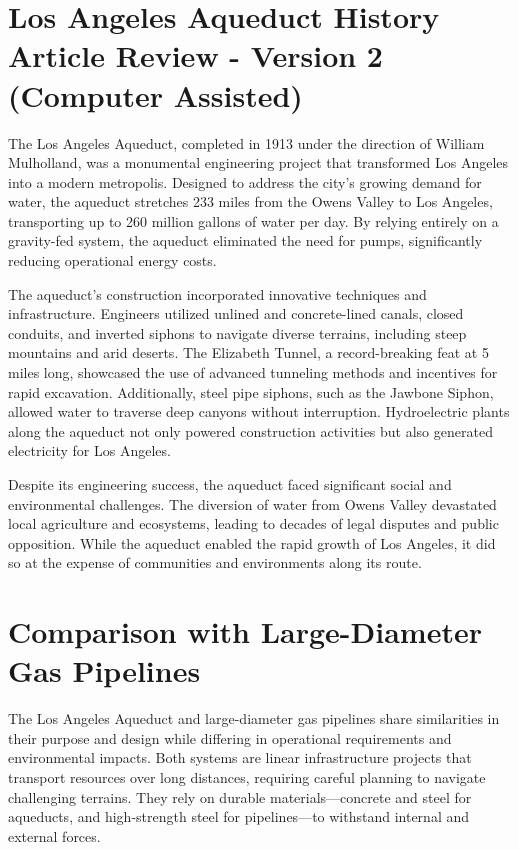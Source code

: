 \documentclass[12pt]{article}
\begin{document}
\section*{\small{Los Angeles Aqueduct History Article Review - Version 2 (Computer Assisted)}}

The Los Angeles Aqueduct, completed in 1913 under the direction of William Mulholland, was a monumental engineering project that transformed Los Angeles into a modern metropolis. Designed to address the city's growing demand for water, the aqueduct stretches 233 miles from the Owens Valley to Los Angeles, transporting up to 260 million gallons of water per day. By relying entirely on a gravity-fed system, the aqueduct eliminated the need for pumps, significantly reducing operational energy costs.

The aqueduct's construction incorporated innovative techniques and infrastructure. Engineers utilized unlined and concrete-lined canals, closed conduits, and inverted siphons to navigate diverse terrains, including steep mountains and arid deserts. The Elizabeth Tunnel, a record-breaking feat at 5 miles long, showcased the use of advanced tunneling methods and incentives for rapid excavation. Additionally, steel pipe siphons, such as the Jawbone Siphon, allowed water to traverse deep canyons without interruption. Hydroelectric plants along the aqueduct not only powered construction activities but also generated electricity for Los Angeles.

Despite its engineering success, the aqueduct faced significant social and environmental challenges. The diversion of water from Owens Valley devastated local agriculture and ecosystems, leading to decades of legal disputes and public opposition. While the aqueduct enabled the rapid growth of Los Angeles, it did so at the expense of communities and environments along its route.

\section*{\small{Comparison with Large-Diameter Gas Pipelines}}

The Los Angeles Aqueduct and large-diameter gas pipelines share similarities in their purpose and design while differing in operational requirements and environmental impacts. Both systems are linear infrastructure projects that transport resources over long distances, requiring careful planning to navigate challenging terrains. They rely on durable materials—concrete and steel for aqueducts, and high-strength steel for pipelines—to withstand internal and external forces.
\end{document}
